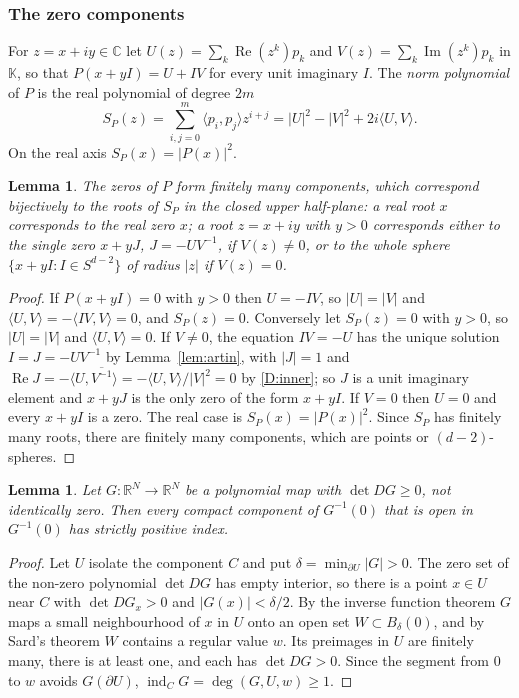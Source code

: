 \documentclass[11pt]{amsart}
\numberwithin{equation}{section}
\theoremstyle{plain}
\newtheorem{lemma}[theorem]{Lemma}
\theoremstyle{definition}
\theoremstyle{remark}
\newcommand{\R}{\mathbb{R}}
\newcommand{\C}{\mathbb{C}}
\newcommand{\K}{\mathbb{K}}
\newcommand{\Imag}{\operatorname{Im}}
\renewcommand{\Re}{\operatorname{Re}}
\begin{document}
\subsubsection{The zero components}

For $z=x+iy\in\C$ let $U(z)=\sum_k\Re(z^k)p_k$ and $V(z)=\sum_k\Imag(z^k)p_k$ in $\K$, so that $P(x+yI)=U+IV$ for every unit imaginary $I$. The \emph{norm polynomial} of $P$ is the real polynomial of degree $2m$
\begin{equation}\label{eq:normpoly}
S_P(z)=\sum_{i,j=0}^m\langle p_i,p_j\rangle z^{i+j}=|U|^2-|V|^2+2i\langle U,V\rangle .
\end{equation}
On the real axis $S_P(x)=|P(x)|^2$.

\begin{lemma}\label{lem:components}
The zeros of $P$ form finitely many components, which correspond bijectively to the roots of $S_P$ in the closed upper half-plane: a real root $x$ corresponds to the real zero $x$; a root $z=x+iy$ with $y>0$ corresponds either to the single zero $x+yJ$, $J=-UV^{-1}$, if $V(z)\neq0$, or to the whole sphere $\{x+yI:I\in S^{d-2}\}$ of radius $|z|$ if $V(z)=0$.
\end{lemma}

\begin{proof}
If $P(x+yI)=0$ with $y>0$ then $U=-IV$, so $|U|=|V|$ and $\langle U,V\rangle=-\langle IV,V\rangle=0$, and $S_P(z)=0$. Conversely let $S_P(z)=0$ with $y>0$, so $|U|=|V|$ and $\langle U,V\rangle=0$. If $V\neq0$, the equation $IV=-U$ has the unique solution $I=J=-UV^{-1}$ by Lemma~\ref{lem:artin}, with $|J|=1$ and $\Re J=-\langle U,\overline{V^{-1}}\rangle=-\langle U,V\rangle/|V|^2=0$ by \ref{D:inner}; so $J$ is a unit imaginary element and $x+yJ$ is the only zero of the form $x+yI$. If $V=0$ then $U=0$ and every $x+yI$ is a zero. The real case is $S_P(x)=|P(x)|^2$. Since $S_P$ has finitely many roots, there are finitely many components, which are points or $(d-2)$-spheres.
\end{proof}

\begin{lemma}\label{lem:positiveindex}
Let $G\colon\R^N\to\R^N$ be a polynomial map with $\det DG\ge0$, not identically zero. Then every compact component of $G^{-1}(0)$ that is open in $G^{-1}(0)$ has strictly positive index.
\end{lemma}

\begin{proof}
Let $U$ isolate the component $C$ and put $\delta=\min_{\partial U}|G|>0$. The zero set of the non-zero polynomial $\det DG$ has empty interior, so there is a point $x\in U$ near $C$ with $\det DG_x>0$ and $|G(x)|<\delta/2$. By the inverse function theorem $G$ maps a small neighbourhood of $x$ in $U$ onto an open set $W\subset B_\delta(0)$, and by Sard's theorem $W$ contains a regular value $w$. Its preimages in $U$ are finitely many, there is at least one, and each has $\det DG>0$. Since the segment from $0$ to $w$ avoids $G(\partial U)$, $\operatorname{ind}_CG=\deg(G,U,w)\ge1$.
\end{proof}
\end{document}

